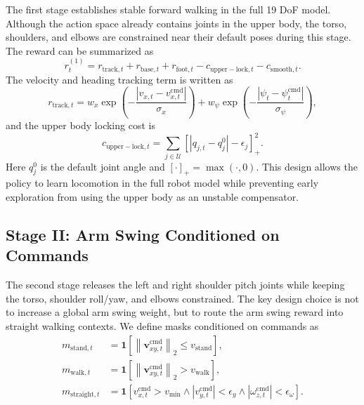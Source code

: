 \documentclass{article}
\newcommand{\relu}[1]{\left[#1\right]_+}
\newcommand{\ind}{\mathbf{1}}
\begin{document}
The first stage establishes stable forward walking in the full 19 DoF model. Although the action space already contains joints in the upper body, the torso, shoulders, and elbows are constrained near their default poses during this stage. The reward can be summarized as
\begin{equation}
r_t^{(1)} =
r_{\mathrm{track},t}
+ r_{\mathrm{base},t}
+ r_{\mathrm{foot},t}
- c_{\mathrm{upper-lock},t}
- c_{\mathrm{smooth},t} .
\end{equation}
The velocity and heading tracking term is written as
\begin{equation}
r_{\mathrm{track},t}
=
w_x \exp\left(-\frac{|v_{x,t}-v_{x,t}^{\mathrm{cmd}}|}{\sigma_x}\right)
+ w_\psi \exp\left(-\frac{|\psi_t-\psi_t^{\mathrm{cmd}}|}{\sigma_\psi}\right),
\end{equation}
and the upper body locking cost is
\begin{equation}
c_{\mathrm{upper-lock},t}
=
\sum_{j\in\mathcal{U}}
\relu{|q_{j,t}-q_j^0|-\epsilon_j}^2 .
\end{equation}
Here $q_j^0$ is the default joint angle and $\relu{\cdot}=\max(\cdot,0)$. This design allows the policy to learn locomotion in the full robot model while preventing early exploration from using the upper body as an unstable compensator.

\subsection{Stage II: Arm Swing Conditioned on Commands}

The second stage releases the left and right shoulder pitch joints while keeping the torso, shoulder roll/yaw, and elbows constrained. The key design choice is not to increase a global arm swing weight, but to route the arm swing reward into straight walking contexts. We define masks conditioned on commands as
\begin{align}
m_{\mathrm{stand},t}
&=
\ind\left[\left\|\mathbf{v}_{xy,t}^{\mathrm{cmd}}\right\|_2
\le v_{\mathrm{stand}}\right],\\
m_{\mathrm{walk},t}
&=
\ind\left[\left\|\mathbf{v}_{xy,t}^{\mathrm{cmd}}\right\|_2
> v_{\mathrm{walk}}\right],\\
m_{\mathrm{straight},t}
&=
\ind\left[
v_{x,t}^{\mathrm{cmd}}>v_{\min}
\land |v_{y,t}^{\mathrm{cmd}}|<\epsilon_y
\land |\omega_{z,t}^{\mathrm{cmd}}|<\epsilon_\omega
\right].
\end{align}
\end{document}
